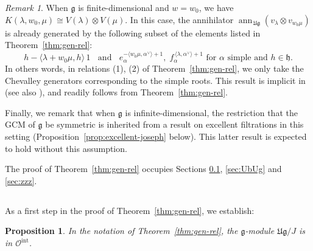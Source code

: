 \documentclass[12pt,reqno]{amsart}
\theoremstyle{plain}
\newtheorem{proposition}[theorem]{Proposition}
\theoremstyle{definition}
\theoremstyle{remark}
\newtheorem{rem}[theorem]{Remark}
\theoremstyle{plain}
\newcommand{\catoint}{\mathcal{O}^{\mathrm{int}}}
\newcommand{\lie}{\mathfrak}
\DeclareMathOperator{\ann}{ann}
\begin{document}
\begin{rem}\label{rem:prvrel}
When $\lie g$ is finite-dimensional and $w=w_0$, we have $K(\lambda, w_0, \mu) \cong V(\lambda) \otimes V(\mu)$. In this case, the annihilator $\ann_{\,\mathfrak{Ug}} (v_\lambda \otimes v_{w_0\mu})$ is already generated by the following subset of the elements listed in Theorem~\ref{thm:gen-rel}:
\[ h - \langle \lambda+w_0\mu, h \rangle \,1\;\; \text{ and } \;\;e_{\alpha}^{-\langle w_0\mu, \alpha^\vee \rangle + 1}, \; f_{\alpha}^{\,\langle \lambda, \alpha^\vee \rangle + 1} \text{ for } \alpha \text{ simple and } h \in \lie h.\]
In others words, in relations (1), (2) of Theorem~\ref{thm:gen-rel}, we only take  the Chevalley generators corresponding to the simple roots. 
This result is implicit in \cite{PRV} (see also \cite{Kum2, GE}), and readily follows from Theorem~\ref{thm:gen-rel}. 
\end{rem}

Finally, we remark that when $\mathfrak{g}$ is infinite-dimensional, the restriction that the GCM of $\mathfrak{g}$ be symmetric is inherited from a result on excellent filtrations in this setting (Proposition~\ref{prop:excellent-joseph} below). This latter result is expected to hold without this assumption.

The proof of Theorem~\ref{thm:gen-rel} occupies Sections \ref{sec:oint}, \ref{sec:UbUg} and \ref{sec:zzz}.


\subsection{} \label{sec:oint}
As a first step in the proof of Theorem~\ref{thm:gen-rel}, we establish:

\begin{proposition}\label{prop:catoint}
In the notation of Theorem~\ref{thm:gen-rel}, the $\mathfrak{g}$-module $\mathfrak{Ug}/J$ is in $\catoint$. 
\end{proposition}
\end{document}
